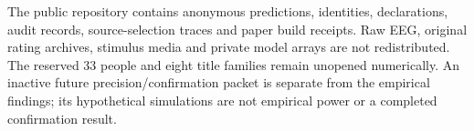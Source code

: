 \documentclass[10pt,a4paper]{article}
\begin{document}
The public repository contains anonymous predictions, identities, declarations, audit records, source-selection traces and paper build receipts. Raw EEG, original rating archives, stimulus media and private model arrays are not redistributed. The reserved 33 people and eight title families remain unopened numerically. An inactive future precision/confirmation packet is separate from the empirical findings; its hypothetical simulations are not empirical power or a completed confirmation result.
\clearpage





\end{document}
